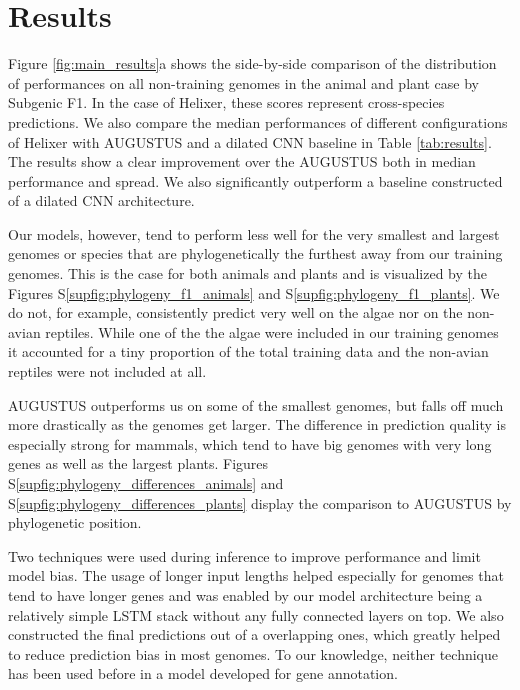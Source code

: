 \documentclass{bioinfo}
\newcounter{supfig}
\begin{document}
\section{Results}
Figure \ref{fig:main_results}a shows the side-by-side comparison of the distribution 
of performances on all non-training genomes in the animal and plant case by Subgenic 
F1. In the case of Helixer, these scores represent cross-species predictions. We 
also compare the median performances of different configurations of Helixer with 
AUGUSTUS and a dilated CNN baseline in Table \ref{tab:results}. The results show a 
clear improvement over the AUGUSTUS both in median performance and spread. We also 
significantly outperform a baseline constructed of a dilated CNN architecture.

Our models, however, tend to perform less well for the very smallest and largest 
genomes or species that are phylogenetically the furthest away from our training 
genomes. This is the case for both animals and plants and is visualized by the 
Figures S\ref{supfig:phylogeny_f1_animals} and S\ref{supfig:phylogeny_f1_plants}. 
We do not, for example, consistently predict very well on the 
algae nor on the non-avian reptiles. While one of the the algae were included 
in our training genomes it accounted for a tiny proportion of the total training 
data and the non-avian reptiles were not included at all.
 
AUGUSTUS outperforms us on some of the smallest genomes, but falls off much more 
drastically as the genomes get larger. The difference in prediction quality is 
especially strong for mammals, which tend to have big genomes with very long genes 
as well as the largest plants. Figures S\ref{supfig:phylogeny_differences_animals} 
and S\ref{supfig:phylogeny_differences_plants} display the comparison to AUGUSTUS 
by phylogenetic position.

Two techniques were used during inference to improve performance and limit model 
bias. The usage of longer input lengths helped especially for genomes that tend to 
have longer genes and was enabled by our model architecture being a relatively 
simple LSTM stack without any fully connected layers on top. We also constructed the 
final predictions out of a overlapping ones, which greatly helped to reduce 
prediction bias in most genomes. To our knowledge, neither technique has been used 
before in a model developed for gene annotation. 
\end{document}
